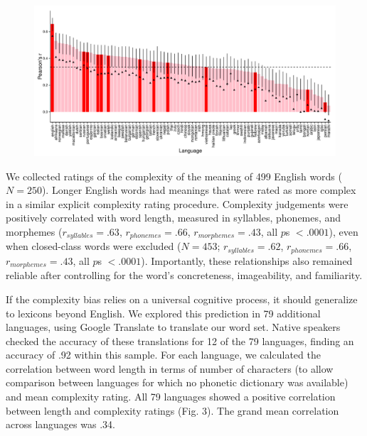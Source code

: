 \documentclass[12pt]{article}
\begin{document}
\begin{figure}[t]
\begin{center}
\includegraphics[scale = .53]{figs/xling.pdf}
\caption{} %
\end{center}
\label{fig:real_objs}
\end{figure}

We collected ratings of the complexity of the meaning of 499 English words ($N = 250$). Longer English words had meanings that were rated as more complex in a similar explicit complexity rating procedure. Complexity judgements were positively correlated with word length, measured in syllables, phonemes, and morphemes ($r_{syllables} = .63$, $r_{phonemes} = .66$, $r_{morphemes} = .43$, all $p$s $< .0001$), even when closed-class words were excluded ($N = 453$; $r_{syllables} = .62$, $r_{phonemes} = .66$, $r_{morphemes} = .43$, all $p$s $< .0001$). Importantly, these relationships also remained reliable after controlling for the word's concreteness, imageability, and familiarity. 
						
If the complexity bias relies on a universal cognitive process, it should generalize to lexicons beyond English. We explored this prediction in 79 additional languages, using Google Translate to translate our word set. Native speakers checked the accuracy of these translations for 12 of the 79 languages, finding an accuracy of .92 within this sample. For each language, we calculated the correlation between word length in terms of number of characters (to allow comparison between languages for which no phonetic dictionary was available) and mean complexity rating. All 79 languages showed a positive correlation between length and complexity ratings (Fig. 3). The grand mean correlation across languages was .34. 
					
\end{document}
